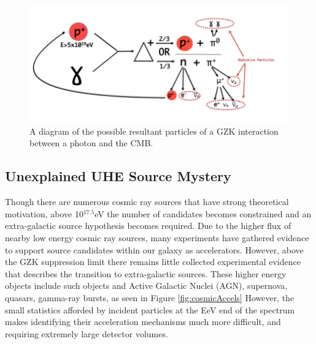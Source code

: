 \noindent		
\begin{figure}
	\includegraphics[width=\textwidth]{figures/GZKDiagram}
	\caption{A diagram of the possible resultant particles of a GZK interaction between a photon and the CMB.}
	\label{fig:GZKDiagram}
\end{figure}
			
		
	\subsection{Unexplained UHE Source Mystery}
		Though there are numerous cosmic ray sources that have strong theoretical motivation, above 10$^{17.5}$eV the number of candidates becomes constrained and an extra-galactic source hypothesis becomes required. \cite{RevModPhys.71.S33}  Due to the higher flux of nearby low energy cosmic ray sources, many experiments have gathered evidence to support source candidates within our galaxy as accelerators.  However, above the GZK suppression limit there remains little collected experimental evidence that describes the transition to extra-galactic sources. These higher energy objects include such objects and Active Galactic Nuclei (AGN), supernova, quasars, gamma-ray bursts, as seen in Figure \ref{fig:cosmicAccels}  However, the small statistics afforded by incident particles at the EeV end of the spectrum makes identifying their acceleration mechanisms much more difficult, and requiring extremely large detector volumes.

